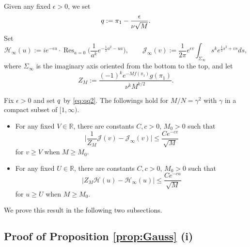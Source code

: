 \documentclass[11pt]{article}
\DeclareMathOperator{\Res}{Res}
\begin{document}
Given any fixed $\epsilon >0$, we set
\begin{equation}\label{eq:qq2}
  q:= \pi_1 - \frac{\epsilon}{\nu \sqrt{M}}.
\end{equation}
Set
\begin{equation}
  \mathcal{H}_\infty(u):= ie^{-\epsilon u} \cdot \displaystyle \Res_{a=0}
\biggl( \frac1{a^k} e^{-\frac12 a^2-ua} \biggr), \qquad
  \mathcal{J}_\infty(v):= \frac{1}{2\pi} e^{\epsilon v}
\int_{\Sigma_\infty} s^k e^{\frac12s^2+vs} ds,
\end{equation}
where $\Sigma_\infty$ is the imaginary axis oriented from the
bottom to the top, and let
\begin{equation}
  Z_M:= \frac{(-1)^ke^{-Mf(\pi_1)}g(\pi_1)}{\nu^k M^{k/2}}.
\end{equation}


\begin{prop}\label{prop:Gauss}
Fix $\epsilon >0$ and set
$q$ by \eqref{eq:qq2}.
The followings hold for $M/N=\gamma^2$ with $\gamma$
in a compact subset of $[1,\infty)$.
\begin{itemize}
\item[(i)]
For any fixed $V\in\mathbb{R}$, there are constants $C, c>0$,
$M_0>0$ such that
\begin{equation}\label{eq:GaussJlimit}
  \biggl| \frac1{Z_M} \mathcal{J}(v) - \mathcal{J}_\infty(v) \bigr|
\le \frac{Ce^{-cv}}{\sqrt{M}}
\end{equation}
for $v\ge V$ when $M\ge M_0$.
\item[(ii)]
For any fixed $U\in\mathbb{R}$, there are constants $C, c>0$,
$M_0>0$ such that
\begin{equation}
  \bigl| Z_M \mathcal{H}(u) - \mathcal{H}_\infty(u) \bigr|
\le \frac{Ce^{-cu}}{\sqrt{M}}
\end{equation}
for $u\ge U$ when $M\ge M_0$.
\end{itemize}
\end{prop}

We prove this result in the following two subsections.


\subsection{Proof of Proposition \ref{prop:Gauss} (i)}\label{sec:Gauss1}
\end{document}
